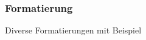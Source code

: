 \begin{frame}
    \frametitle{Formatierung}
    \begin{block}{Diverse Formatierungen mit Beispiel}
        \begin{columns}
            \begin{column}{0.59\textwidth}
                
            \end{column}
            \begin{column}{0.35\textwidth}
                \rule{0pt}{15pt}
                \\
                
            \end{column}
        \end{columns}
    \end{block}
\end{frame}

